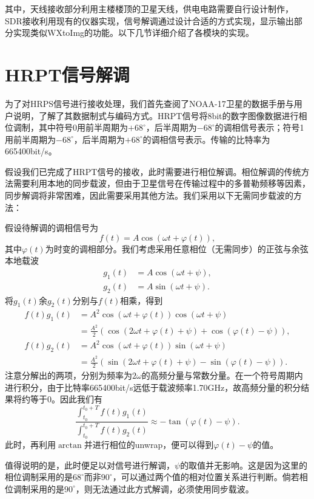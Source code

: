 \documentclass[UTF8]{ctexart}
\begin{document}
其中，天线接收部分利用主楼楼顶的卫星天线，供电电路需要自行设计制作，SDR接收利用现有的仪器实现，信号解调通过设计合适的方式实现，显示输出部分实现类似WXtoImg的功能。以下几节详细介绍了各模块的实现。

\section{HRPT信号解调}

为了对HRPS信号进行接收处理，我们首先查阅了NOAA-17卫星的数据手册与用户说明，了解了其数据制式与编码方式。HRPT信号将8bit的数字图像数据进行相位调制，其中符号0用前半周期为$+68^\circ$，后半周期为$-68^\circ$的调相信号表示；符号1用前半周期为$-68^\circ$，后半周期为$+68^\circ$的调相信号表示。传输的比特率为665400bit/s。

假设我们已完成了HRPT信号的接收，此时需要进行相位解调。相位解调的传统方法需要利用本地的同步载波，但由于卫星信号在传输过程中的多普勒频移等因素，同步解调将非常困难，因此需要采用其他方法。我们采用以下无需同步载波的方法：

假设待解调的调相信号为
$$
f(t) = A\cos(\omega t+\varphi(t)),
$$
其中$\varphi(t)$为时变的调相部分。我们考虑采用任意相位（无需同步）的正弦与余弦本地载波
\begin{align}
  \nonumber
  g_1(t) &= A\cos(\omega t+\psi),\\
  \nonumber
  g_2(t) &= A\sin(\omega t+\psi).
\end{align}
将$g_1(t)$余$g_2(t)$分别与$f(t)$相乘，得到
\begin{align}
  \nonumber
  f(t)g_1(t) &= A^2 \cos(\omega t+\varphi(t)) \cos(\omega t+\psi) \\
  \nonumber
  &= \frac{A^2}{2} \left( \cos(2\omega t+\varphi(t)+\psi) + \cos(\varphi(t)-\psi) \right), \\
  \nonumber
  f(t)g_2(t) &= A^2 \cos(\omega t+\varphi(t)) \sin(\omega t+\psi) \\
  \nonumber
  &= \frac{A^2}{2} \left( \sin(2\omega t+\varphi(t)+\psi) - \sin(\varphi(t)-\psi) \right).
\end{align}
注意分解出的两项，分别为频率为$2\omega$的高频分量与常数分量。在一个符号周期内进行积分，由于比特率665400bit/s远低于载波频率1.70GHz，故高频分量的积分结果将约等于0。因此我们有
$$
\frac{\int_{t_0}^{t_0+T}f(t)g_1(t)}{\int_{t_0}^{t_0+T}f(t)g_2(t)} \approx - \tan(\varphi(t)-\psi).
$$
此时，再利用$\arctan$并进行相位的unwrap，便可以得到$\varphi(t)-\psi$的值。

值得说明的是，此时便足以对信号进行解调，$\psi$的取值并无影响。这是因为这里的相位调制采用的是$68^\circ$而非$90^\circ$，可以通过两个值的相对位置关系进行判断。倘若相位调制采用的是$90^\circ$，则无法通过此方式解调，必须使用同步载波。
\end{document}
